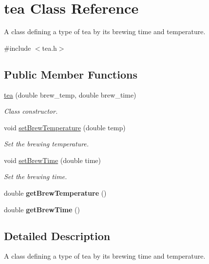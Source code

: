 \hypertarget{classtea}{}\section{tea Class Reference}
\label{classtea}


A class defining a type of tea by its brewing time and temperature.  




{\ttfamily \#include $<$tea.\+h$>$}

\subsection*{Public Member Functions}
\begin{DoxyCompactItemize}
\item 
\mbox{\hyperlink{classtea_ae5f444d5215b49aae039b46a47ad908f}{tea}} (double brew\+\_\+temp, double brew\+\_\+time)
\begin{DoxyCompactList}\small\item\em Class constructor. \end{DoxyCompactList}\item 
void \mbox{\hyperlink{classtea_a6853c9899596abea3121aae76b12e5f6}{set\+Brew\+Temperature}} (double temp)
\begin{DoxyCompactList}\small\item\em Set the brewing temperature. \end{DoxyCompactList}\item 
void \mbox{\hyperlink{classtea_aa541720b90b31274c3bba3e77d765c81}{set\+Brew\+Time}} (double time)
\begin{DoxyCompactList}\small\item\em Set the brewing time. \end{DoxyCompactList}\item 
\mbox{\label{classtea_a8a83c91eb834c18d646e048e82a8528b}} 
double {\bfseries get\+Brew\+Temperature} ()
\item 
\mbox{\label{classtea_a550ccb4846b555ed1717e7e8373d8a25}} 
double {\bfseries get\+Brew\+Time} ()
\end{DoxyCompactItemize}


\subsection{Detailed Description}
A class defining a type of tea by its brewing time and temperature. 

